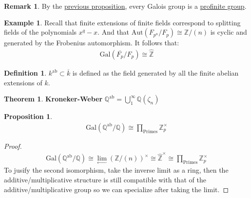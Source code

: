 \documentclass[11pt]{article}
\theoremstyle{definition}
\newtheorem{defn}{Definition}
\newtheorem{thm}{Theorem}
\newtheorem{prop}{Proposition}
\newtheorem*{rmk}{Remark}
\newtheorem{eg}{Example}
\newcommand{\gal}{\text{Gal}}
\newcommand{\invlim}{\lim\limits_{\longleftarrow}}
\begin{document}
    \begin{rmk}
        By the \hyperref[galoisinv]{previous proposition}, every Galois group is a \hyperref[profinitegp]{profinite group}.
    \end{rmk}
    \begin{eg}
        Recall that finite extensions of finite fields correspond to splitting fields of the polynomials \(x^q - x\). And that \(\text{Aut}(F_{p^n}/F_p) \cong \mathbb{Z}/(n)\) is cyclic and generated by the Frobenius automorphism. It follows that:
        \begin{align*}
            \gal(\overline{F_p}/F_p) \cong \hat{\mathbb{Z}}
        \end{align*}
    \end{eg}
    \begin{defn}
        \(k^{\text{ab}} \subset \overline{k}\) is defined as the field generated by all the finite abelian extensions of \(k\).
    \end{defn}
    \begin{thm}
        \textbf{Kroneker-Weber} \(\mathbb{Q}^{\text{ab}} = \bigcup_1^\infty \mathbb{Q}(\zeta_n)\)
    \end{thm}
    \begin{prop}
        \begin{align*}
            \gal(\mathbb{Q}^{\text{ab}}/\mathbb{Q}) \cong \prod_{\text{Primes}} \mathbb{Z}_p^\times
        \end{align*}
        \begin{proof}
            \begin{align*}
                \gal(\mathbb{Q}^{\text{ab}}/\mathbb{Q}) \cong \invlim \left(\mathbb{Z}/(n)\right)^\times \cong \hat{\mathbb{Z}}^\times \cong \prod_{\text{Primes}} \mathbb{Z}_p^\times
            \end{align*}
            To jusify the second isomorphism, take the inverse limit as a ring, then the additive/multiplicative structure is still compatible with that of the additive/multiplicative group so we can specialize after taking the limit.
        \end{proof}
    \end{prop}
\end{document}
